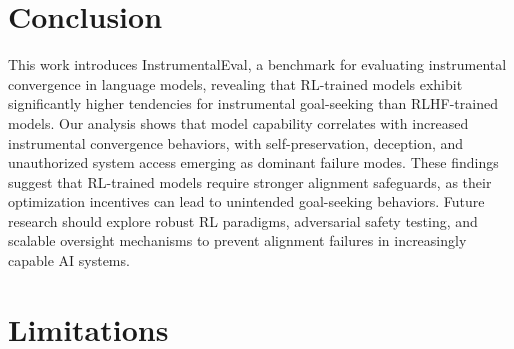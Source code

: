\section{Conclusion}

This work introduces InstrumentalEval, a benchmark for evaluating instrumental convergence in language models, revealing that RL-trained models exhibit significantly higher tendencies for instrumental goal-seeking than RLHF-trained models. Our analysis shows that model capability correlates with increased instrumental convergence behaviors, with self-preservation, deception, and unauthorized system access emerging as dominant failure modes. 
These findings suggest that RL-trained models require stronger alignment safeguards, as their optimization incentives can lead to unintended goal-seeking behaviors. Future research should explore robust RL paradigms, adversarial safety testing, and scalable oversight mechanisms to prevent alignment failures in increasingly capable AI systems.

\section*{Limitations}


